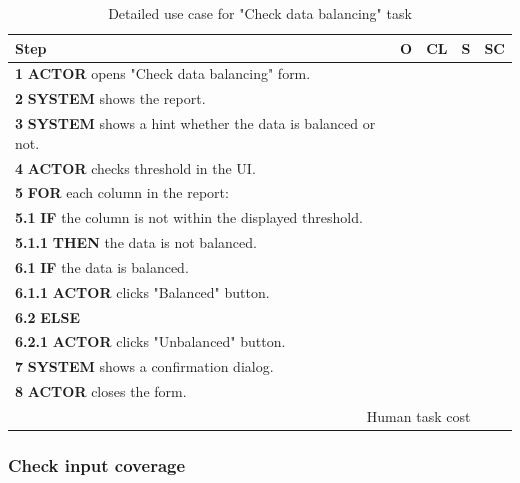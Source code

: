 \begin{table}[H]
\centering
\begin{tabular}{|l|c|c|c|c|}
\hline
\textbf{Step} & \textbf{O} & \textbf{CL} & \textbf{S} & \textbf{SC} \\
\hline
\textbf{1} \textbf{ACTOR} opens "Check data balancing" form. & & & & \\
\hline
\textbf{2} \textbf{SYSTEM} shows the report. & & & & \\
\hline
\textbf{3} \textbf{SYSTEM} shows a hint whether the data is balanced or not. & & & & \\
\hline
\textbf{4} \textbf{ACTOR} checks threshold in the UI. & & & & \\
\hline
\textbf{5} \textbf{FOR} each column in the report: & & & & \\
\hline
\textbf{5.1} \textbf{IF} the column is not within the displayed threshold. & & & & \\
\hline
\textbf{5.1.1} \textbf{THEN} the data is not balanced. & & & & \\
\hline
\textbf{6.1} \textbf{IF} the data is balanced. & & & & \\
\hline
\textbf{6.1.1} \textbf{ACTOR} clicks "Balanced" button. & & & & \\
\hline
\textbf{6.2} \textbf{ELSE} & & & & \\
\hline
\textbf{6.2.1} \textbf{ACTOR} clicks "Unbalanced" button. & & & & \\
\hline
\textbf{7} \textbf{SYSTEM} shows a confirmation dialog. & & & & \\
\hline
\textbf{8} \textbf{ACTOR} closes the form. & & & & \\
\hline
\multicolumn{4}{|r|}{Human task cost} & \\
\hline
\end{tabular}
\caption{Detailed use case for "Check data balancing" task}
\label{table:check_data_balancing}
\end{table}

\subsubsection{Check input coverage}


